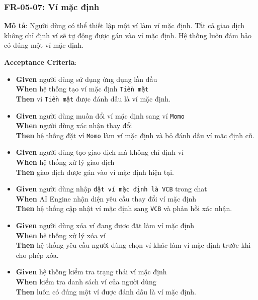 \subsubsection{FR-05-07: Ví mặc định}

\textbf{Mô tả}: Người dùng có thể thiết lập một ví làm ví mặc định. Tất cả giao dịch không chỉ định ví sẽ tự động được gán vào ví mặc định. Hệ thống luôn đảm bảo có đúng một ví mặc định.



\textbf{Acceptance Criteria}:

\begin{itemize}
\item \textbf{Given} người dùng sử dụng ứng dụng lần đầu  \\ \hspace*{1.5em}  \textbf{When} hệ thống tạo ví mặc định \texttt{Tiền mặt}  \\ \hspace*{1.5em}  \textbf{Then} ví \texttt{Tiền mặt} được đánh dấu là ví mặc định.
\item \textbf{Given} người dùng muốn đổi ví mặc định sang ví \texttt{Momo}  \\ \hspace*{1.5em}  \textbf{When} người dùng xác nhận thay đổi  \\ \hspace*{1.5em}  \textbf{Then} hệ thống đặt ví \texttt{Momo} làm ví mặc định và bỏ đánh dấu ví mặc định cũ.
\item \textbf{Given} người dùng tạo giao dịch mà không chỉ định ví  \\ \hspace*{1.5em}  \textbf{When} hệ thống xử lý giao dịch  \\ \hspace*{1.5em}  \textbf{Then} giao dịch được gán vào ví mặc định hiện tại.
\item \textbf{Given} người dùng nhập \texttt{đặt ví mặc định là VCB} trong chat  \\ \hspace*{1.5em}  \textbf{When} AI Engine nhận diện yêu cầu thay đổi ví mặc định  \\ \hspace*{1.5em}  \textbf{Then} hệ thống cập nhật ví mặc định sang \texttt{VCB} và phản hồi xác nhận.
\item \textbf{Given} người dùng xóa ví đang được đặt làm ví mặc định  \\ \hspace*{1.5em}  \textbf{When} hệ thống xử lý xóa ví  \\ \hspace*{1.5em}  \textbf{Then} hệ thống yêu cầu người dùng chọn ví khác làm ví mặc định trước khi cho phép xóa.
\item \textbf{Given} hệ thống kiểm tra trạng thái ví mặc định  \\ \hspace*{1.5em}  \textbf{When} kiểm tra danh sách ví của người dùng  \\ \hspace*{1.5em}  \textbf{Then} luôn có đúng một ví được đánh dấu là ví mặc định.
\end{itemize}
